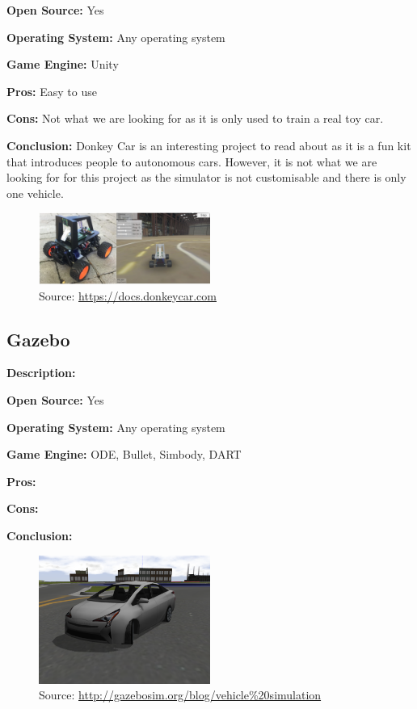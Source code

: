 \textbf{Open Source:} Yes

\textbf{Operating System:} Any operating system

\textbf{Game Engine:} Unity

\textbf{Pros:} Easy to use

\textbf{Cons:} Not what we are looking for as it is only used to train a real toy car.

\textbf{Conclusion:} Donkey Car is an interesting project to read about as it is a fun kit that introduces people to autonomous cars. However, it is not what we are looking for for this project as the simulator is not customisable and there is only one vehicle. 


\begin{figure}[H]
    \centering
    \includegraphics[width=0.5\textwidth]{Simulators/DonkeySim.jpg}
    \caption{Source: \url{https://docs.donkeycar.com}}
\end{figure}

\subsection{Gazebo}
\textbf{Description:}

\textbf{Open Source:} Yes

\textbf{Operating System:} Any operating system

\textbf{Game Engine:} ODE, Bullet, Simbody, DART

\textbf{Pros:}

\textbf{Cons:}

\textbf{Conclusion:} 


\begin{figure}[H]
    \centering
    \includegraphics[width=0.5\textwidth]{Simulators/gazebo.png}
    \caption{Source: \url{http://gazebosim.org/blog/vehicle\%20simulation}}
\end{figure}


